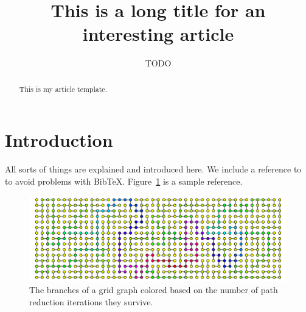 \documentclass[12pt,reqno]{amsart}
\title[Short title]{This is a long title for an interesting article}
\author[T.~ODO]{TODO}
\theoremstyle{remark}
\theoremstyle{definition}
\begin{document}
\begin{abstract}
This is my article template.
\end{abstract}

\maketitle

\section{Introduction}

All sorts of things are explained and introduced here. We include
a reference to~\cite{Hackl:2018:shape-parameters-trees} to avoid problems
with BibTeX. Figure~\ref{fig:grid} is a sample reference.

\begin{figure}[ht]
  \centering
  \includegraphics[width=0.9\linewidth]{gridfun.pdf}
  \caption{The branches of a grid graph colored based on
    the number of path reduction iterations they survive.
  }\label{fig:grid}
\end{figure}



\end{document}

